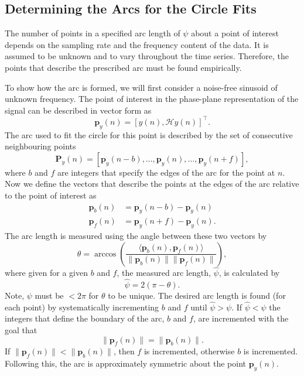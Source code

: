 \documentclass[a4paper]{IEEEtran}
\begin{document}
\subsection{Determining the Arcs for the Circle Fits}\label{sect:FindingArc}
The number of points in a specified arc length of $\psi$ about a point of interest depends on the sampling rate and the frequency content of the data. It is assumed to be unknown and to vary throughout the time series. Therefore, the points that describe the prescribed arc must be found empirically.

To show how the arc is formed, we will first consider a noise-free sinusoid of unknown frequency. The point of interest in the phase-plane representation of the signal can be described in vector form as
\begin{equation}
	\mathbf{p}_y(n) = \left[y\left(n\right),\mathcal{H}y\left(n\right)\right]^{\top}.
\end{equation}
The arc used to fit the circle for this point is described by the set of consecutive neighbouring points
\begin{equation}
	\mathbf{P}_y(n) = \left[\mathbf{p}_y(n-b),\hdots,\mathbf{p}_y(n),\hdots,\mathbf{p}_y(n+f)\right],
\end{equation}
where $b$ and $f$ are integers that specify the edges of the arc for the point at $n$. Now we define the vectors that describe the points at the edges of the arc relative to the point of interest as
\begin{align}
	\mathbf{p}_b(n) &= \mathbf{p}_y(n-b)-\mathbf{p}_y(n) \\
	\mathbf{p}_f(n) &= \mathbf{p}_y(n+f)-\mathbf{p}_y(n).
\end{align}
The arc length is measured using the angle between these two vectors by
\begin{equation}
	\theta = \arccos\left(\frac{\langle\mathbf{p}_b(n),\mathbf{p}_f(n)\rangle}{\|\mathbf{p}_b(n)\| \|\mathbf{p}_f(n)\|}\right),
\end{equation}
where given for a given $b$ and $f$, the measured arc length, $\hat\psi$, is calculated by
\begin{equation}\label{eq:theta_2_psi}
	\hat\psi = 2(\pi-\theta).
\end{equation}
Note, $\psi$ must be $<2\pi$ for $\theta$ to be unique. The desired arc length is found (for each point) by systematically incrementing $b$ and $f$ until $\hat\psi > \psi$. If $\hat\psi < \psi$ the integers that define the boundary of the arc, $b$ and $f$, are incremented with the goal that
\begin{equation}\label{eq:balanced_distances}
	\|\mathbf{p}_f(n)\| = \|\mathbf{p}_b(n)\|.
\end{equation}
If $\|\mathbf{p}_f(n)\| < \|\mathbf{p}_b(n)\|$, then $f$ is incremented, otherwise $b$ is incremented. Following this, the arc is approximately symmetric about the point $\mathbf{p}_y(n)$. 
\end{document}
